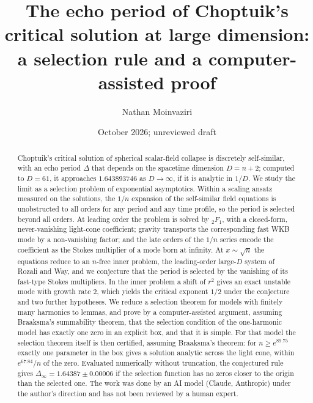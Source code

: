 \documentclass{amsart}
\numberwithin{equation}{section}
\theoremstyle{plain}
\theoremstyle{definition}
\theoremstyle{remark}
\newcommand{\Dinf}{\Delta_\infty}
\begin{document}
\title[The echo period at large dimension]{The echo period of Choptuik's critical solution at large dimension:\\
a selection rule and a computer-assisted proof}

\author{Nathan Moinvaziri}
\address{Independent researcher}
\date{October 2026; unreviewed draft}

\begin{abstract}
Choptuik's critical solution of spherical scalar-field collapse is discretely self-similar, with an echo period $\Delta$
that depends on the spacetime dimension $D = n + 2$; computed to $D = 61$, it approaches $1.643893746$ as $D \to \infty$, if it is
analytic in $1/D$. We study the
limit as a selection problem of exponential asymptotics. Within a scaling ansatz measured on the solutions, the $1/n$
expansion of the self-similar field equations is unobstructed to all orders for any period and any time profile, so the
period is selected beyond all orders. At leading order the problem is solved by ${}_2F_1$, with a closed-form,
never-vanishing light-cone coefficient; gravity transports the corresponding fast WKB mode by a non-vanishing factor; and
the late orders of the $1/n$ series encode the coefficient as the Stokes multiplier of a mode born at infinity. At
$x \sim \sqrt n$ the equations reduce to an $n$-free inner problem, the leading-order large-$D$ system of Rozali and Way, and we
conjecture that the period is selected by the vanishing of its fast-type Stokes multipliers. In the inner problem a shift
of $r^2$ gives an exact unstable mode with growth rate $2$, which yields the critical exponent $1/2$ under the conjecture
and two further hypotheses. We reduce a selection theorem for models with finitely many harmonics to lemmas, and prove by a
computer-assisted argument, assuming Braaksma's summability theorem, that the selection condition of the one-harmonic model
has exactly one zero in an explicit box, and that it is simple. For that model the selection theorem itself is then
certified, assuming Braaksma's theorem: for $n \ge e^{89.75}$ exactly one parameter in the box gives a solution analytic
across the light cone, within $e^{67.84}/n$ of the zero. Evaluated numerically
without truncation, the conjectured rule gives $\Dinf = 1.64387 \pm 0.00006$ if the selection function has no zeros
closer to the origin than the selected one. The work was done by an AI model (Claude, Anthropic) under the author's direction and has not been reviewed by a human expert.
\end{abstract}
\end{document}
